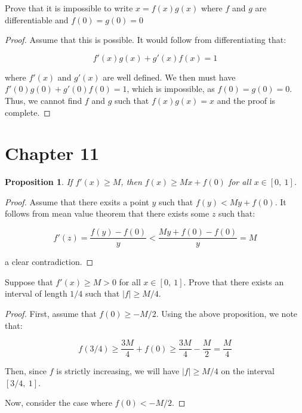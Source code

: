 \documentclass[10pt, oneside]{amsart}
\newenvironment{problem}[2][Problem]{\begin{trivlist}
\item[\hskip \labelsep {\bfseries #1}\hskip \labelsep {\bfseries #2.}]}{\end{trivlist}}
\newtheorem{prop}{Proposition}
\begin{document}
    \begin{problem}{10.28}
      Prove that it is impossible to write $x = f(x) g(x)$ where $f$ and $g$ are differentiable and $f(0) = g(0) = 0$
    \end{problem}

    \begin{proof}
      Assume that this is possible. It would follow from differentiating that:

      $$f'(x) g(x) + g'(x) f(x) = 1$$

      where $f'(x)$ and $g'(x)$ are well defined. We then must have $f'(0) g(0) + g'(0) f(0) = 1$, which is impossible, as
      $f(0) = g(0) = 0$. Thus, we cannot find $f$ and $g$ such that $f(x) g(x) = x$ and the proof is complete.
    \end{proof}

    \section{Chapter 11}

    \begin{prop}
      If $f'(x) \geq M$, then $f(x) \geq Mx + f(0)$ for all $x \in [0, \ 1]$.
    \end{prop}

    \begin{proof}
      Assume that there exsits a point $y$ such that $f(y) < My + f(0)$. It follows from mean value theorem that there exists some $z$ such that:

      $$f'(z) = \frac{f(y) - f(0)}{y} < \frac{My + f(0) - f(0)}{y} = M$$

      a clear contradiction.
    \end{proof}

    \begin{problem}{11.26}
      Suppose that $f'(x) \geq M > 0$ for all $x \in [0, \ 1]$. Prove that there exists an interval of length $1/4$ such that
      $|f| \geq M/4$.
    \end{problem}

    \begin{proof}
      First, assume that $f(0) \geq -M/2$. Using the above proposition, we note that:

      $$f(3/4) \geq \frac{3M}{4} + f(0) \geq \frac{3M}{4} - \frac{M}{2} = \frac{M}{4}$$

      Then, since $f$ is strictly increasing, we will have $|f| \geq M/4$ on the interval $[3/4, \ 1]$.
      \newline

      Now, consider the case where $f(0) < -M/2$. 
      \end{proof}
\end{document}
